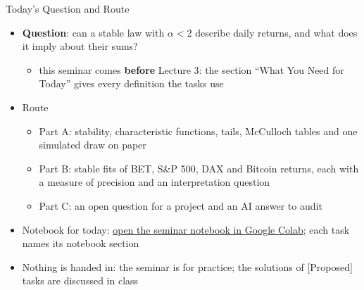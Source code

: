 \begin{frame}{Today's Question and Route}
\itemsize{\small}
\begin{itemize}
    \item \textbf{Question}: can a stable law with $\alpha < 2$ describe daily returns, and what does it imply about their sums?
    \begin{itemize}
        \item this seminar comes \textbf{before} Lecture 3: the section ``What You Need for Today'' gives every definition the tasks use
    \end{itemize}
    \item Route
    \begin{itemize}
        \item Part A: stability, characteristic functions, tails, McCulloch tables and one simulated draw on paper
        \item Part B: stable fits of BET, S\&P 500, DAX and Bitcoin returns, each with a measure of precision and an interpretation question
        \item Part C: an open question for a project and an AI answer to audit
    \end{itemize}
    \item Notebook for today: \href{\nb}{open the seminar notebook in Google Colab}; each task names its notebook section
    \item Nothing is handed in: the seminar is for practice; the solutions of [Proposed] tasks are discussed in class
\end{itemize}
\end{frame}

